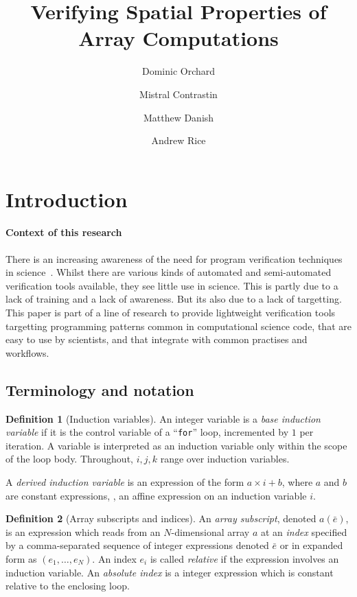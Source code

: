 \documentclass[acmlarge,review,anonymous]{acmart}\settopmatter{printfolios=true}
\title{Verifying Spatial Properties of Array Computations}
\author{Dominic Orchard}
\affiliation{
  \department{School of Computing}
  \institution{University of Kent}
}
\author{Mistral Contrastin}
\affiliation{
  \department{Computer Laboratory}
  \institution{University of Cambridge}
}
\author{Matthew Danish}
\affiliation{
  \department{Computer Laboratory}
  \institution{University of Cambridge}
}
\author{Andrew Rice}
\affiliation{
  \department{Computer Laboratory}
  \institution{University of Cambridge}
}
\theoremstyle{definition}
\newtheorem{defn}{Definition}
\theoremstyle{plain}
\theoremstyle{remark}
\begin{document}
\maketitle

\section{Introduction}

\paragraph{Context of this research}

There is an increasing awareness of the need for program verification
techniques in
science~\cite{post2005computational,oberkampf2010verification,orchard2014computational}.
Whilst there are various kinds of automated and semi-automated
verification tools available, they see little use in science. This is
partly due to a lack of training and a lack of awareness. But its also
due to a lack of targetting. This paper is part of a line of research
to provide lightweight verification tools targetting
programming patterns common in computational science code, 
that are easy to use by scientists, and that integrate with common
practises and workflows.


\subsection{Terminology and notation}

\begin{defn}[Induction variables]
  An integer variable is a \emph{base induction variable} if it is the control
  variable of a ``\texttt{for}'' loop, incremented by $1$ per iteration. A variable
  is interpreted as an induction variable only within the scope of the loop
  body. Throughout, $i, j, k$ range over induction variables.

  A \emph{derived induction variable} is an expression of the form $a \times i
  + b$, where $a$ and $b$ are constant expressions, \ie{}, an affine expression
  on an induction variable $i$.
\end{defn}

\begin{defn}[Array subscripts and indices]\label{def:array-subs}
  An \emph{array subscript}, denoted $a(\bar{e})$, is an expression which reads
  from an $N$-dimensional array $a$ at an \emph{index} specified by a
  comma-separated sequence of integer expressions denoted $\bar{e}$ or in
  expanded form as $(e_1, \ldots, e_N)$. An index $e_i$ is called
  \emph{relative} if the expression involves an induction variable. An
  \emph{absolute index} is a integer expression which is constant relative to
  the enclosing loop.
\end{defn}
\end{document}

